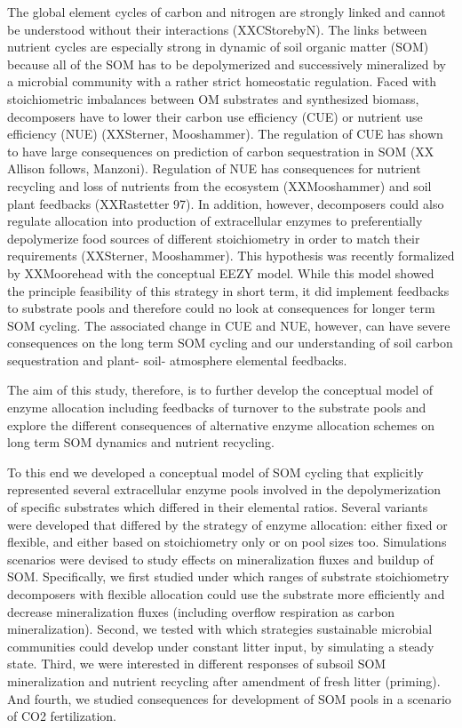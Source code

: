 \introduction  %
The global element cycles of carbon and nitrogen are strongly linked and cannot
be understood without their interactions (XXCStorebyN). The links between nutrient
cycles are especially strong in dynamic of soil organic matter (SOM) because all
of the SOM has to be depolymerized and successively mineralized by a microbial
community with a rather strict homeostatic regulation. Faced with stoichiometric
imbalances between OM substrates and synthesized biomass, decomposers have to
lower their carbon use efficiency (CUE) or nutrient use efficiency (NUE) 
(XXSterner, Mooshammer). The regulation of CUE has shown to have large
consequences on prediction of carbon sequestration in SOM (XX Allison follows,
Manzoni). Regulation of NUE has consequences for nutrient recycling and loss of
nutrients from the ecosystem (XXMooshammer) and soil plant feedbacks
(XXRastetter 97). In addition, however, decomposers could also regulate
allocation into production of extracellular enzymes to preferentially
depolymerize food sources of different stoichiometry in order to match their
requirements (XXSterner, Mooshammer). This hypothesis was recently formalized by
XXMoorehead with the conceptual EEZY model. While this model showed the
principle feasibility of this strategy in short term, it did implement feedbacks
to substrate pools and therefore could no look at consequences for longer term
SOM cycling. The associated change in CUE and NUE, however, can have severe
consequences on the long term SOM cycling and our understanding of soil carbon
sequestration and plant- soil- atmosphere elemental feedbacks.

The aim of this study, therefore, is to further develop the conceptual model of
enzyme allocation including feedbacks of turnover to the substrate pools and
explore the different consequences of alternative enzyme allocation schemes on
long term SOM dynamics and nutrient recycling.

To this end we developed a conceptual model of SOM cycling that explicitly
represented several extracellular enzyme pools involved in the depolymerization
of specific substrates which differed in their elemental ratios. Several
variants were developed that differed by the strategy of enzyme allocation:
either fixed or flexible, and either based on stoichiometry only or on pool
sizes too. Simulations scenarios were devised to study effects on mineralization
fluxes and buildup of SOM. Specifically, we first studied under which ranges of
substrate stoichiometry decomposers with flexible allocation could use the
substrate more efficiently and decrease mineralization fluxes (including
overflow respiration as carbon mineralization). Second, we tested with which
strategies sustainable microbial communities could develop under constant litter
input, by simulating a steady state. Third, we were interested in different
responses of subsoil SOM mineralization and nutrient recycling after amendment
of fresh litter (priming). And fourth, we studied consequences for development
of SOM pools in a scenario of CO2 fertilization.

